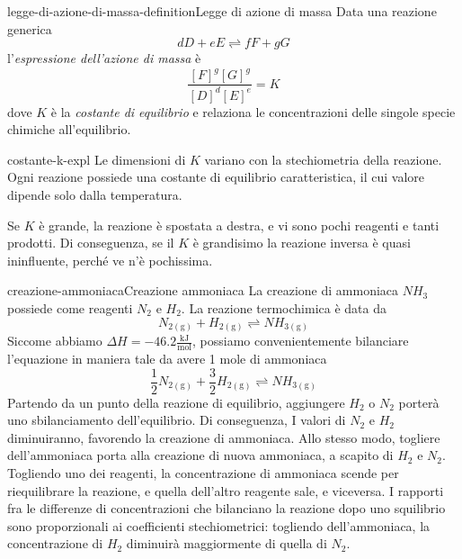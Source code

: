 \documentclass[preview]{standalone}
\begin{document}

\begin{snippetdefinition}{legge-di-azione-di-massa-definition}{Legge di azione di massa}
    Data una reazione generica
    \[
        dD + eE \rightleftharpoons fF + gG
    \]
    l'\textit{espressione dell'azione di massa} è
    \[ \frac{{[F]}^g{[G]}^g}{{[D]}^d{[E]}^e} = K \]
    dove \(K\)  è la \textit{costante di equilibrio} e relaziona
    le concentrazioni delle singole specie chimiche all'equilibrio.
\end{snippetdefinition}

\begin{snippet}{costante-k-expl}
    Le dimensioni di \(K\) variano con la stechiometria della reazione.\\
Ogni reazione possiede una costante di equilibrio caratteristica,
il cui valore dipende solo dalla temperatura.

Se \(K\) è grande, la reazione è spostata a destra,
e vi sono pochi reagenti e tanti prodotti.
Di conseguenza, se il \(K\) è grandisimo la reazione inversa è quasi
ininfluente, perché ve n'è pochissima.
\end{snippet}

\begin{snippetexample}{creazione-ammoniaca}{Creazione ammoniaca}
    La creazione di ammoniaca \(NH_3\) possiede come reagenti \(N_2\) e \(H_2\).
    La reazione termochimica è data da
    \[
        N_{2(\text{g})} + H_{2(\text{g})}   \rightleftharpoons NH_{3(\text{g})}      
    \]
    Siccome abbiamo \(\Delta H = -46.2 \frac{\text{kJ}}{\text{mol}}\),
    possiamo convenientemente bilanciare l'equazione in maniera tale da avere 1 mole di ammoniaca
    \[
        \frac{1}{2}N_{2(\text{g})} + \frac{3}{2}H_{2(\text{g})}   \rightleftharpoons NH_{3(\text{g})}
    \]
    Partendo da un punto della reazione di equilibrio,
    aggiungere \(H_2\) o \(N_2\) porterà uno sbilanciamento dell'equilibrio.
    Di conseguenza,
    I valori di \(N_2\) e \(H_2\) diminuiranno, favorendo la creazione di ammoniaca.
    Allo stesso modo, togliere dell'ammoniaca porta alla creazione di nuova ammoniaca, a scapito
    di \(H_2\) e \(N_2\).
    Togliendo uno dei reagenti, la concentrazione di ammoniaca scende per riequilibrare la reazione,
    e quella dell'altro reagente sale, e viceversa.
    I rapporti fra le differenze di concentrazioni che bilanciano la reazione dopo
    uno squilibrio sono proporzionali ai coefficienti stechiometrici:
    togliendo dell'ammoniaca, la concentrazione di \(H_2\) diminuirà maggiormente di quella di \(N_2\).
\end{snippetexample}
\end{document}
